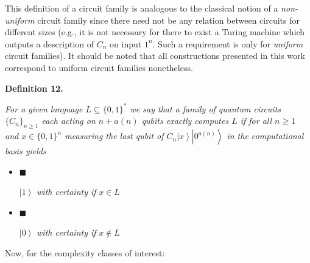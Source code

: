 \documentclass[10pt,a4paper]{article}
\begin{document}



This definition of a circuit family is analogous to the classical notion of a \emph{non-uniform} circuit family since there need not be any relation between circuits for different sizes (e.g., it is not necessary for there to exist a Turing machine which outputs a description of $C_{n}$ on input $1^{n}$. Such a requirement is only for \emph{uniform} circuit families). It should be noted that all constructions presented in this work correspond to uniform circuit families nonetheless.\par





\par\medskip\noindent\textbf{
\textbf{Definition 12}\textbf{.}
}\par



\emph{For a given language $L\subseteq\{0,1\}^{*}$ we say that a family of quantum circuits $\{C_{n}\}_{n\geq 1}$ each acting on $n+a(n)$ qubits exactly computes $L$ if for all $n\geq 1$ and $x\in\{0,1\}^{n}$ measuring the last qubit of $C_{n}\left|x\right\rangle\left|0^{a(n)}\right\rangle$ in the computational basis yields}\par


\begin{itemize}


\item[] 
$\blacksquare$ 


$\left|1\right\rangle$\emph{ with certainty if }$x\in L$\emph{}\par





\item[] 
$\blacksquare$ 


$\left|0\right\rangle$\emph{ with certainty if }$x\not\in L$\emph{}\par





\end{itemize}






Now, for the complexity classes of interest:\par
\end{document}
